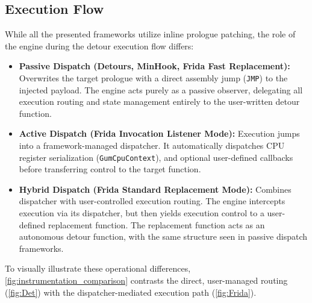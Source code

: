 \subsection{Execution Flow}
\label{subsec:hook_dispatch}

While all the presented frameworks utilize inline prologue patching, the role of the engine during the detour execution flow differs:

\begin{itemize}
	\item \textbf{Passive Dispatch (Detours, MinHook, Frida Fast Replacement):} Overwrites the target prologue with a direct assembly jump (\texttt{JMP}) to the injected payload. The engine acts purely as a passive observer, delegating all execution routing and state management entirely to the user-written detour function.
	
	\item \textbf{Active Dispatch (Frida Invocation Listener Mode):} Execution jumps into a framework-managed dispatcher. It automatically dispatches CPU register serialization (\texttt{GumCpuContext}), and optional user-defined callbacks before transferring control to the target function.
	
	\item \textbf{Hybrid Dispatch (Frida Standard Replacement Mode):} Combines dispatcher with user-controlled execution routing. The engine intercepts execution via its dispatcher, but then yields execution control to a user-defined replacement function. The replacement function acts as an autonomous detour function, with the same structure seen in passive dispatch frameworks.
\end{itemize}

To visually illustrate these operational differences, \cref{fig:instrumentation_comparison} contrasts the direct, user-managed routing (\cref{fig:Det}) with the dispatcher-mediated execution path (\cref{fig:Frida}).

